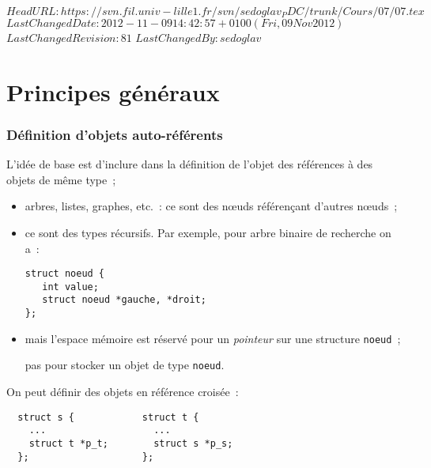 \svnidlong 
{$HeadURL: https://svn.fil.univ-lille1.fr/svn/sedoglav_PDC/trunk/Cours/07/07.tex $} 
{$LastChangedDate: 2012-11-09 14:42:57 +0100 (Fri, 09 Nov 2012) $} 
{$LastChangedRevision: 81 $} 
{$LastChangedBy: sedoglav $} 
\section{Principes g\'en\'eraux}%
\begin{frame}[fragile]
  \frametitle{D\'efinition d'objets auto-r\'ef\'erents}%
  L'id\'ee de base est d'inclure dans la d\'efinition de l'objet des
  r\'ef\'erences \`a des objets de m\^eme type~;
\begin{itemize}
  \item arbres, listes, graphes, etc.~: ce sont des n\oe{}uds
    r\'ef\'eren\c{c}ant d'autres n\oe{}uds~;
  \item ce sont des types r\'ecursifs. Par exemple, pour arbre binaire de
    recherche on a~:
\begin{verbatim}
struct noeud {
   int value;
   struct noeud *gauche, *droit;
};
\end{verbatim}
  \item mais l'espace m\'emoire est r\'eserv\'e pour un {\em pointeur}
    sur une structure {\tt noeud}~;
    \begin{it}
      pas pour stocker un objet de type {\tt noeud}. 
    \end{it}
\end{itemize}
On peut d\'efinir des objets en r\'ef\'erence crois\'ee~:
\begin{verbatim}
  struct s {            struct t {         
    ...                   ...              
    struct t *p_t;        struct s *p_s;   
  };                    };            
\end{verbatim}
\end{frame}
